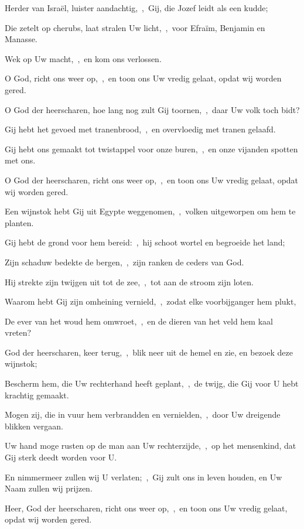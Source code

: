 \documentclass[12pt,twoside,a5paper]{article}
\begin{document}

\begin{halfparskip}

  Herder van Israël, luister aandachtig,~\sep\ Gij, die Jozef leidt als een kudde;

  Die zetelt op cherubs, laat stralen Uw licht,~\sep\ voor Efraïm, Benjamin en Manasse.

  Wek op Uw macht,~\sep\ en kom ons verlossen.

  O God, richt ons weer op,~\sep\ en toon ons Uw vredig gelaat, opdat wij worden gered.

  O God der heerscharen, hoe lang nog zult Gij toornen,~\sep\ daar Uw volk toch bidt?

  Gij hebt het gevoed met tranenbrood,~\sep\ en overvloedig met tranen gelaafd.

  Gij hebt ons gemaakt tot twistappel voor onze buren,~\sep\ en onze vijanden spotten met ons.

  O God der heerscharen, richt ons weer op,~\sep\ en toon ons Uw vredig gelaat, opdat wij worden gered.
\end{halfparskip}

\begin{halfparskip}

  Een wijnstok hebt Gij uit Egypte weggenomen,~\sep\ volken uitgeworpen om hem te planten.

  Gij hebt de grond voor hem bereid:~\sep\ hij schoot wortel en begroeide het land;

  Zijn schaduw bedekte de bergen,~\sep\ zijn ranken de ceders van God.

  Hij strekte zijn twijgen uit tot de zee,~\sep\ tot aan de stroom zijn loten.

  Waarom hebt Gij zijn omheining vernield,~\sep\ zodat elke voorbijganger hem plukt,

  De ever van het woud hem omwroet,~\sep\ en de dieren van het veld hem kaal vreten?

  God der heerscharen, keer terug,~\sep\ blik neer uit de hemel en zie, en bezoek deze wijnstok;

  Bescherm hem, die Uw rechterhand heeft geplant,~\sep\ de twijg, die Gij voor U hebt krachtig gemaakt.

  Mogen zij, die in vuur hem verbrandden en vernielden,~\sep\ door Uw dreigende blikken vergaan.

  Uw hand moge rusten op de man aan Uw rechterzijde,~\sep\ op het mensenkind, dat Gij sterk deedt worden voor U.

  En nimmermeer zullen wij U verlaten;~\sep\ Gij zult ons in leven houden, en Uw Naam zullen wij prijzen.

  Heer, God der heerscharen, richt ons weer op,~\sep\ en toon ons Uw vredig gelaat, opdat wij worden gered.
\end{halfparskip}
\end{document}

